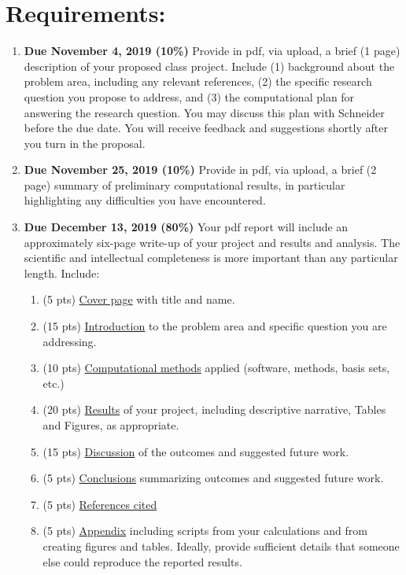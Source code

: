 \documentclass[11pt]{article}
\begin{document}
\section{Requirements:}
\label{sec:orgd6b25d3}
\begin{enumerate}
\item \textbf{Due November 4, 2019 (10\%)} Provide in pdf, via upload, a brief (1 page) description of your proposed class project.  Include (1) background about the problem area, including any relevant references, (2) the specific research question you propose to address, and (3) the computational plan for answering the research question. You may discuss this plan with Schneider before the due date. You will receive feedback and suggestions shortly after you turn in the proposal.
\item \textbf{Due November 25, 2019 (10\%)} Provide in pdf, via upload, a brief (2 page) summary of preliminary computational results, in particular highlighting any difficulties you have encountered.
\item \textbf{Due December 13, 2019 (80\%)} Your pdf report will include an approximately six-page write-up of your project and results and analysis.  The scientific and intellectual completeness is more important than any particular length. Include:
\begin{enumerate}
\item (5 pts) \uline{Cover page} with title and name.
\item (15 pts) \uline{Introduction} to the problem area and specific question you are addressing.
\item (10 pts) \uline{Computational methods} applied (software, methods, basis sets, etc.)
\item (20 pts) \uline{Results} of your project, including descriptive narrative, Tables and Figures, as appropriate.
\item (15 pts) \uline{Discussion} of the outcomes and suggested future work.
\item (5 pts) \uline{Conclusions} summarizing outcomes and suggested future work.
\item (5 pts) \uline{References cited}
\item (5 pts) \uline{Appendix} including scripts  from your calculations and from creating figures and tables. Ideally, provide sufficient details that someone else could reproduce the reported results.
\end{enumerate}
\end{enumerate}
\end{document}
